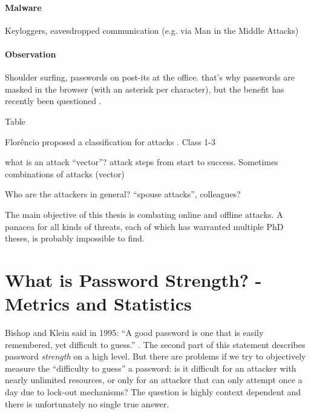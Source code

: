 
\paragraph{Malware} Keyloggers, eavesdropped communication (e.g. via Man in the Middle Attacks)

\paragraph{Observation} Shoulder surfing, passwords on post-its at the office. that's why passwords are masked in the browser (with an asterisk per character), but the benefit has recently been questioned \cite{Sasse2016DebunkingMyths}. 

Table 



Florêncio \etal proposed a classification for attacks \cite{Florencio2014PasswordPortfoliosFiniteUser}. Class 1-3

what is an attack ``vector''? attack steps from start to success. \ar
Sometimes combinations of attacks (vector)

Who are the attackers in general? ``spouse attacks'', colleagues? \cite{Ur2016PerceptionsPassword}


The main objective of this thesis is combating online and offline attacks. A panacea for all kinds of threats, each of which has warranted multiple PhD theses, is probably impossible to find. 

\section{What is Password Strength? - Metrics and Statistics}\label{sec:rw:pw_strength_metrics}
Bishop and Klein said in 1995: ``A good password is one that is easily remembered, yet difficult to guess.'' \cite[p. 231]{Bishop1995ProactivePasswordChecking}. The second part of this statement describes password \textit{strength} on a high level. But there are problems if we try to objectively measure the ``difficulty to guess'' a password: is it difficult for an attacker with nearly unlimited resources, or only for an attacker that can only attempt once a day due to lock-out mechanisms? The question is highly context dependent and there is unfortunately no single true answer. 

